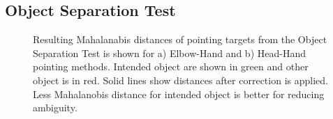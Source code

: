 \subsection{Object Separation Test}

\begin{figure}[ht!]
\centering
%
    \caption{%
	Resulting Mahalanabis distances of pointing targets from the Object Separation Test is shown for a) Elbow-Hand and b) Head-Hand pointing methods. Intended object are shown in green and other object is in red. Solid lines show distances after correction is applied. Less Mahalanobis distance for intended object is better for reducing ambiguity.
     }%
   \label{fig:pointing_graphs}
\end{figure}


